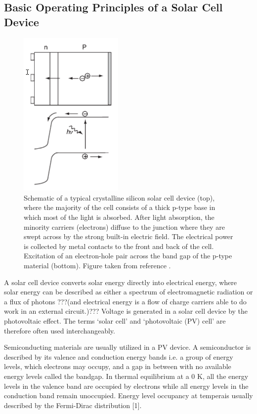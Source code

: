 \subsection{Basic Operating Principles of a Solar Cell Device}


\begin{figure}[h!]
  \centering
    \includegraphics[width=0.45\textwidth]{figures/PV_schematic.png}
    \caption{Schematic of a typical crystalline silicon solar cell device (top), where the majority of the cell consists of a thick p-type base in which most of the light is absorbed.  After light absorption, the minority carriers (electrons) diffuse to the junction where they are swept across by the strong built-in electric field. The electrical power is collected by metal contacts to the front and back of the cell. Excitation of an electron-hole pair across the band gap of the p-type material (bottom). 
    Figure taken from reference .}
  \label{PV_schematic}
\end{figure}

A solar cell device converts solar energy directly into electrical energy, where solar energy can be described as either a spectrum of electromagnetic radiation or a flux of photons ???(and electrical energy is a flow of charge carriers able to do work in an external circuit.)??? \cite{spatial_resolved_book} Voltage is generated in a solar cell device by the photovoltaic effect. The terms `solar cell' and `photovoltaic (PV) cell' are therefore often used interchangeably.  

Semiconducting materials are usually utilized in a PV device. A semiconductor is described by its valence and conduction energy
bands i.e. a group of energy levels, which electrons may occupy, and a gap in
between with no available energy levels called the bandgap. In thermal equilibrium
at a 0 K, all the energy levels in the valence band are occupied by electrons
while all energy levels in the conduction band remain unoccupied. Energy level
occupancy at temperais usually described by the Fermi-Dirac distribution [1]. \cite{spatial_resolved_book}

